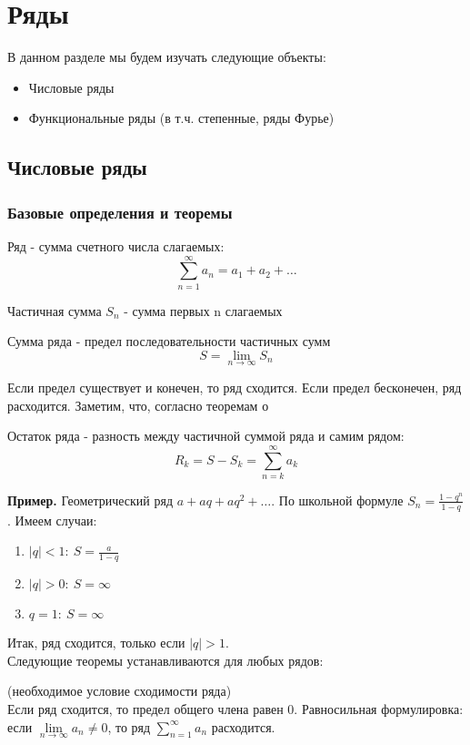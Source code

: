 \chapter{Ряды}
В данном разделе мы будем изучать следующие объекты:
\begin{itemize}
    \item Числовые ряды
    \item Функциональные ряды (в т.ч. степенные, ряды Фурье)
\end{itemize}

\section{Числовые ряды}
\subsection{Базовые определения и теоремы}
\begin{defin}
Ряд - сумма счетного числа слагаемых: $$\sum_{n=1}^{\infty} a_n =a_1+a_2+
\ldots$$
\end{defin}
\begin{defin}
Частичная сумма $S_n$ - сумма первых n слагаемых
\end{defin}
\begin{defin}
Сумма ряда - предел последовательности частичных сумм 
$$S=\lim\limits_{n \to \infty}S_n$$
\end{defin}
Если предел существует и конечен, то ряд сходится. Если предел бесконечен, ряд 
расходится. Заметим, что, согласно теоремам о 
\begin{defin}
Остаток ряда - разность между частичной суммой ряда и самим рядом: 
$$R_k=S-S_k=\sum_{n=k}^{\infty} a_k$$
\end{defin}
\textbf{Пример.} Геометрический ряд $a+aq+aq^2+\ldots$. По школьной 
формуле $S_n=\frac{1-q^n}{1-q}$. Имеем случаи:
\begin{enumerate}
    \item $|q|<1:~S=\frac{a}{1-q}$ 
    \item $|q|>0:~S=\infty$
    \item $q=1:~S=\infty$
\end{enumerate}
Итак, ряд сходится, только если $|q|>1$.\\
Следующие теоремы устанавливаются для любых рядов:
\begin{theor}(необходимое условие сходимости ряда)\\
Если ряд сходится, то предел общего члена равен 0.
Равносильная формулировка: если
$\lim\limits_{n\to\infty} a_n\ne0$, то ряд $\sum\limits_{n=1}^{\infty} a_n $
расходится.
\end{theor}
